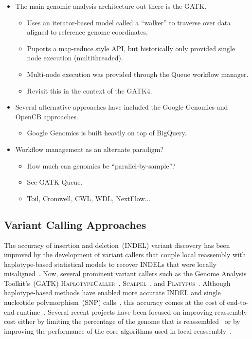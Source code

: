 \documentclass[phd]{ucbthesis}
\begin{document}
\begin{itemize}
\item The main genomic analysis architecture out there is the GATK.
  \begin{itemize}
  \item Uses an iterator-based model called a ``walker'' to traverse over
    data aligned to reference genome coordinates.
  \item Puports a map-reduce style API, but historically only provided single
    node execution (multithreaded).
  \item Multi-node execution was provided through the Queue workflow manager.
  \item Revisit this in the context of the GATK4.
  \end{itemize}
\item Several alternative approaches have included the Google Genomics and
  OpenCB approaches.
  \begin{itemize}
    \item Google Genomics is built heavily on top of BigQuery.
  \end{itemize}
\item Workflow management as an alternate paradigm?
  \begin{itemize}
  \item How much can genomics be ``parallel-by-sample''?
  \item See GATK Queue.
  \item Toil, Cromwell, CWL, WDL, NextFlow...
  \end{itemize}
\end{itemize}

\subsection{Variant Calling Approaches}
\label{sec:variant-calling-approaches}


The accuracy of insertion and deletion~(INDEL) variant discovery has been improved by the development
of variant callers that couple local reassembly with haplotype-based statistical models to recover INDELs
that were locally misaligned~\cite{albers11}. Now, several prominent variant callers such as the Genome
Analysis Toolkit's~(GATK) \textsc{HaplotypeCaller}~\cite{depristo11}, \textsc{Scalpel}~\cite{narzisi14}, and
\textsc{Platypus}~\cite{rimmer14}. Although haplotype-based methods have enabled more accurate INDEL
and single nucleotide polymorphism~(SNP) calls~\cite{bao14}, this accuracy comes at the cost of
end-to-end runtime~\cite{talwalkar14}. Several recent projects have been focused on improving
reassembly cost either by limiting the percentage of the genome that is reassembled~\cite{bloniarz14} or
by improving the performance of the core algorithms used in local reassembly~\cite{rimmer14}.
\end{document}
